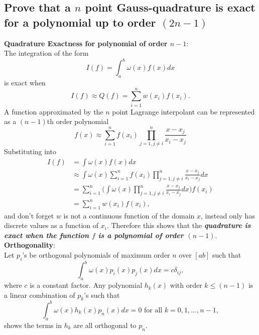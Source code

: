 
\subsection{\bf Prove that a $n$ point Gauss-quadrature is exact for a polynomial up to order $(2n-1)$} 
{\bf Quadrature Exactness for polynomial of order $n-1$}: \\
The integration of the form
\begin{equation}
  I(f) = \int_{a}^{b} \omega(x) f(x) dx
\end{equation}
is exact when 
\begin{equation} \label{eq:qep}
  I(f) \approx Q(f) = \sum_{i=1}^{n} w(x_i) f(x_i).
\end{equation}
A function approximated by the $n$ point Lagrange interpolant can be represented as a $(n-1)$th order polynomial
\begin{equation}
  f(x) \approx \sum_{i=1}^{n} f(x_i) \prod\limits_{j=1,j\neq i}^{n}\frac{x-x_j}{x_i-x_j}
\end{equation}
Substituting into 
\begin{equation}
  \begin{aligned}
    I(f) & = \int \omega(x) f(x) dx  \\
         & \approx \int \omega(x)\sum_{i=1}^{n} f(x_i) \prod\limits_{j=1,j \neq
	 i}^{n}\frac{x-x_j}{x_i-x_j}dx \\
         & = \sum_{i=1}^{n} \Big( \int \omega(x) \prod\limits_{j=1,j \neq
	 i}^{n}\frac{x-x_j}{x_i-x_j} dx \Big) f(x_i) \\
         & = \sum_{i=1}^{n} w(x_i) f(x_i),
  \end{aligned}
\end{equation}
and don't forget $w$ is not a continuous function of the domain $x$, instead only has discrete
values as a function of $x_i$.
Therefore this shows that the {\bf\emph{quadrature is exact when the function $f$ is a polynomial of order
$(n-1)$}}. \\

{\noindent \bf Orthogonality}: \\
Let $p_i$'s be orthogonal polynomials of maximum order $n$ over $[a b]$ such that
\begin{equation}
  \int_{a}^{b} \omega(x) p_i(x) p_j(x) dx = c \delta_{ij},
\end{equation}
where $c$ is a constant factor. 
Any polynomial $h_k(x)$ with order $k \le (n-1)$ is a linear combination
of $p_k$'s such that
\begin{equation} \label{eq:orth}
   \int_a^b \omega(x) h_k(x) p_n(x)dx= 0 \text{ for all } k= 0,1, \dotsc, n-1,
\end{equation}
shows the terms in $h_k$ are all orthogonal to $p_n$. \\

